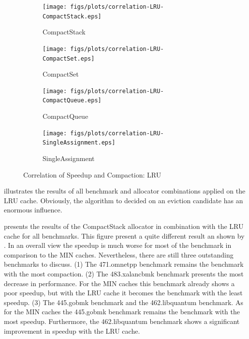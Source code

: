 \documentclass[onecolumn, openright, master, english, signatures]{dbrgrptt}
\begin{document}
\begin{figure}[!ht]
  \begin{subfigure}[b]{0.5\textwidth}%
    \texttt{[image: figs/plots/correlation-LRU-CompactStack.eps]}
    \caption{CompactStack}
    \label{fig:correlation-lru-compactstack}
  \end{subfigure}%
  \begin{subfigure}[b]{0.5\textwidth}%
    \texttt{[image: figs/plots/correlation-LRU-CompactSet.eps]}
    \caption{CompactSet}
    \label{fig:correlation-lru-compactset}
  \end{subfigure}%
  \qquad
  \begin{subfigure}[b]{0.5\textwidth}%
    \texttt{[image: figs/plots/correlation-LRU-CompactQueue.eps]}
    \caption{CompactQueue}
    \label{fig:correlation-lru-compactqueue}
  \end{subfigure}%
  \begin{subfigure}[b]{0.5\textwidth}%
    \texttt{[image: figs/plots/correlation-LRU-SingleAssignment.eps]}
    \caption{SingleAssignment}
    \label{fig:correlation-lru-singleassignment}
  \end{subfigure}%
  \caption{Correlation of Speedup and Compaction: LRU}
  \label{fig:correlation-lru}
\end{figure}

 illustrates the results of all benchmark and allocator combinations applied on the \ac{LRU} cache. Obviously, the algorithm to decided on an eviction candidate has an enormous influence.

 presents the results of the CompactStack allocator in combination with the \ac{LRU} cache for all benchmarks. This figure present a quite different result an shown by . In an overall view the speedup is much worse for most of the benchmark in comparison to the \ac{MIN} caches. Nevertheless, there are still three outstanding benchmarks to discuss. (1) The 471.omnetpp benchmark remains the benchmark with the most compaction. (2) The 483.xalancbmk benchmark presents the most decrease in performance. For the \ac{MIN} caches this benchmark already shows a poor speedup, but with the \ac{LRU} cache it becomes the benchmark with the least speedup. (3) The 445.gobmk benchmark and the 462.libquantum benchmark. As for the \ac{MIN} caches the 445.gobmk benchmark remains the benchmark with the most speedup. Furthermore, the 462.libquantum benchmark shows a significant improvement in speedup with the \ac{LRU} cache.
\end{document}
